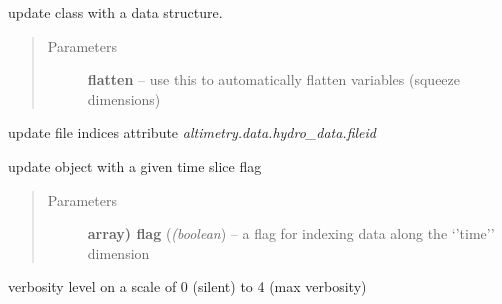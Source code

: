 \documentclass[letterpaper,10pt,english]{sphinxmanual}
\begin{document}
\begin{fulllineitems}

\begin{fulllineitems}
\label{altimetry.data:altimetry.data.hydro_data.update_dataset}
update class with a data structure.
\begin{quote}\begin{description}
\item[{Parameters}] \leavevmode
\textbf{flatten} -- use this to automatically flatten variables (squeeze dimensions)

\end{description}\end{quote}

\end{fulllineitems}


\begin{fulllineitems}
\label{altimetry.data:altimetry.data.hydro_data.update_fid_list}
update file indices attribute \emph{altimetry.data.hydro\_data.fileid}

\end{fulllineitems}


\begin{fulllineitems}
\label{altimetry.data:altimetry.data.hydro_data.update_with_slice}
update object with a given time slice flag
\begin{quote}\begin{description}
\item[{Parameters}] \leavevmode
\textbf{array) flag} (\emph{(boolean}) -- a flag for indexing data along the `'time'' dimension

\end{description}\end{quote}

\end{fulllineitems}


\begin{fulllineitems}
\label{altimetry.data:altimetry.data.hydro_data.verbose}
verbosity level on a scale of 0 (silent) to 4 (max verbosity)


\end{fulllineitems}
\end{fulllineitems}
\end{document}
